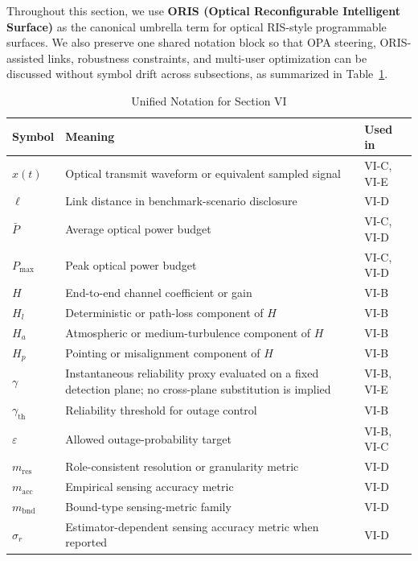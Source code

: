\documentclass[lettersize,journal]{IEEEtran}
\begin{document}
Throughout this section, we use \textbf{ORIS (Optical Reconfigurable Intelligent Surface)} as the canonical umbrella term for optical RIS-style programmable surfaces. We also preserve one shared notation block so that OPA steering, ORIS-assisted links, robustness constraints, and multi-user optimization can be discussed without symbol drift across subsections, as summarized in Table~\ref{tab:section6_notation}.




\begin{table}[!t]
\caption{Unified Notation for Section VI}
\label{tab:section6_notation}
\centering
\footnotesize
\begin{tabularx}{\columnwidth}{@{}>{\raggedright\arraybackslash}p{1.85cm}>{\raggedright\arraybackslash}X>{\raggedright\arraybackslash}p{1.55cm}@{}}
\toprule
\textbf{Symbol} & \textbf{Meaning} & \textbf{Used in} \\
\midrule
$x(t)$ & Optical transmit waveform or equivalent sampled signal & VI-C, VI-E \\
$\ell$ & Link distance in benchmark-scenario disclosure & VI-D \\
$\bar P$ & Average optical power budget & VI-C, VI-D \\
$P_{\max}$ & Peak optical power budget & VI-C, VI-D \\
$H$ & End-to-end channel coefficient or gain & VI-B \\
$H_l$ & Deterministic or path-loss component of $H$ & VI-B \\
$H_a$ & Atmospheric or medium-turbulence component of $H$ & VI-B \\
$H_p$ & Pointing or misalignment component of $H$ & VI-B \\
$\gamma$ & Instantaneous reliability proxy evaluated on a fixed detection plane; no cross-plane substitution is implied & VI-B, VI-E \\
$\gamma_{\text{th}}$ & Reliability threshold for outage control & VI-B \\
$\varepsilon$ & Allowed outage-probability target & VI-B, VI-C \\
$m_{\text{res}}$ & Role-consistent resolution or granularity metric & VI-D \\
$m_{\text{acc}}$ & Empirical sensing accuracy metric & VI-D \\
$m_{\text{bnd}}$ & Bound-type sensing-metric family & VI-D \\
$\sigma_r$ & Estimator-dependent sensing accuracy metric when reported & VI-D \\

\end{tabularx}
\end{table}
\end{document}
